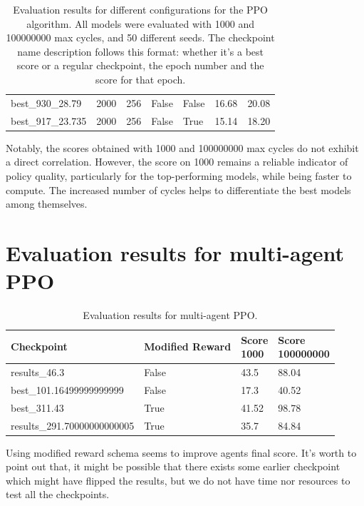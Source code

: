 \documentclass[12pt,a4paper, onecolumn]{exam}
\begin{document}
\begin{appendices}
\begin{table}[H]
\begin{tabular}{|l|l|l|l|l|l|l|}
            best\_930\_28.79     & 2000                & 256                          & False & False & 16.68 & 20.08  \\
            best\_917\_23.735    & 2000                & 256                          & False & True  & 15.14 & 18.20  \\
            \hline
        \end{tabular}
        \caption{Evaluation results for different configurations for the PPO algorithm. All models were evaluated with 1000
            and 100000000 max cycles, and 50 different seeds. The checkpoint name description
            follows this format: whether it's a best score or a regular checkpoint, the epoch number and the score for that epoch. }
        \label{tab:app_best_models}
    \end{table}

    Notably, the scores obtained with 1000 and 100000000 max cycles do not exhibit a direct correlation.
    However, the score on 1000 remains a reliable indicator of policy quality, particularly for the top-performing models, while being faster to compute.
    The increased number of cycles helps to differentiate the best models among themselves.


    \section{Evaluation results for multi-agent PPO}

    \begin{table}[H]
        \centering
        \begin{tabular}{|l|l|l|l|}
            \hline
            \textbf{Checkpoint}         & \textbf{Modified Reward} & \shortstack{\textbf{Score}         \\\textbf{1000}} & \shortstack{\textbf{Score}\\\textbf{100000000}} \\
            \hline
            results\_46.3               & False                    & 43.5                       & 88.04 \\
            best\_101.16499999999999    & False                    & 17.3                       & 40.52 \\
            best\_311.43                & True                     & 41.52                      & 98.78 \\
            results\_291.70000000000005 & True                     & 35.7                       & 84.84 \\
            \hline
        \end{tabular}
        \caption{Evaluation results for multi-agent PPO.}
        \label{tab:multi_ppo_results}
    \end{table}
    Using modified reward schema seems to improve agents final score. It's worth to point out that, it might be possible
    that there exists some earlier checkpoint which might have flipped the results, but we do not have time nor resources
    to test all the checkpoints.

\end{appendices}
\end{document}
